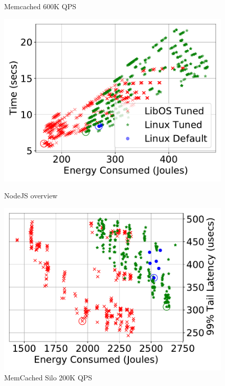\begin{figure}[thb]
\begin{minipage}[t]{0.45\textwidth}
	\caption{Memcached 600K QPS}
	\label{fig:mcdov}
\end{minipage}
\begin{minipage}[t]{0.45\textwidth}
	\includegraphics[width=\textwidth]{osdi_figures/nodejs_overview.pdf}
	\caption{NodeJS overview}
	\label{fig:nodejsov}
\end{minipage}
\begin{minipage}[t]{0.45\textwidth}
	\includegraphics[width=\columnwidth]{osdi_figures/mcdsilo_200000_overview.pdf}
	\caption{MemCached Silo 200K QPS}
	\label{fig:mcdsiloov}
\end{minipage}
\end{figure}


